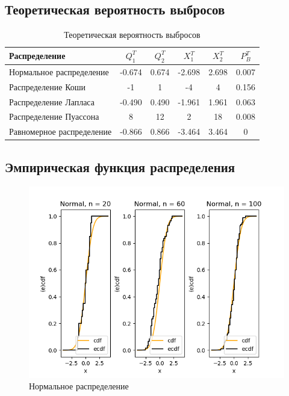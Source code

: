 \documentclass[../body.tex]{subfiles}
\begin{document}
\subsection{Теоретическая вероятность выбросов}
\begin{table}[H]
	\begin{center}
		\begin{tabular}{ l  c  c  c  c  c }
			\hline
			Распределение    & $Q_1^T$ & $Q_2^T$ & $X_1^T$ & $X_2^T$ & $P_B^T$ \\ \hline
			Нормальное распределение & -0.674 & 0.674 & -2.698 & 2.698 & 0.007 \\ 
			Распределение Коши & -1 & 1 & -4 & 4 & 0.156 \\ 
			Распределение Лапласа & -0.490 & 0.490 & -1.961 & 1.961 & 0.063 \\ 
			Распределение Пуассона & 8 & 12 & 2 & 18 & 0.008 \\ 
			Равномерное распределение & -0.866 & 0.866 & -3.464 & 3.464 & 0 \\   \hline
		\end{tabular}
		\caption{Теоретическая вероятность выбросов}
		\label{tab:theor}
	\end{center}
\end{table}

\subsection{Эмпирическая функция распределения}

\begin{figure}[H]
	\centering
	\includegraphics[width=\textwidth, height =0.4\textheight]{img/NormalCDF.png}
	\caption{Нормальное распределение}
	\label{fig:normal_cdf}
\end{figure}
\end{document}
